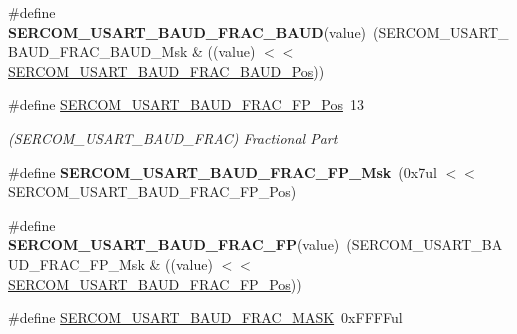 \begin{DoxyCompactItemize}
\item 
\hypertarget{group___s_a_m_l21___s_e_r_c_o_m_gabd6ad21c63e82ef1b06b39a46a5aab1a}{}\#define {\bfseries S\+E\+R\+C\+O\+M\+\_\+\+U\+S\+A\+R\+T\+\_\+\+B\+A\+U\+D\+\_\+\+F\+R\+A\+C\+\_\+\+B\+A\+U\+D}(value)~(S\+E\+R\+C\+O\+M\+\_\+\+U\+S\+A\+R\+T\+\_\+\+B\+A\+U\+D\+\_\+\+F\+R\+A\+C\+\_\+\+B\+A\+U\+D\+\_\+\+Msk \& ((value) $<$$<$ \hyperlink{group___s_a_m_l21___s_e_r_c_o_m_ga2091fb88df34a0e20b88f6e63c31d953}{S\+E\+R\+C\+O\+M\+\_\+\+U\+S\+A\+R\+T\+\_\+\+B\+A\+U\+D\+\_\+\+F\+R\+A\+C\+\_\+\+B\+A\+U\+D\+\_\+\+Pos}))\label{group___s_a_m_l21___s_e_r_c_o_m_gabd6ad21c63e82ef1b06b39a46a5aab1a}

\item 
\hypertarget{group___s_a_m_l21___s_e_r_c_o_m_ga8a5c9a949a3fc03e5aca3d033fd0b323}{}\#define \hyperlink{group___s_a_m_l21___s_e_r_c_o_m_ga8a5c9a949a3fc03e5aca3d033fd0b323}{S\+E\+R\+C\+O\+M\+\_\+\+U\+S\+A\+R\+T\+\_\+\+B\+A\+U\+D\+\_\+\+F\+R\+A\+C\+\_\+\+F\+P\+\_\+\+Pos}~13\label{group___s_a_m_l21___s_e_r_c_o_m_ga8a5c9a949a3fc03e5aca3d033fd0b323}

\begin{DoxyCompactList}\small\item\em (S\+E\+R\+C\+O\+M\+\_\+\+U\+S\+A\+R\+T\+\_\+\+B\+A\+U\+D\+\_\+\+F\+R\+A\+C) Fractional Part \end{DoxyCompactList}\item 
\hypertarget{group___s_a_m_l21___s_e_r_c_o_m_gaeb0b40ddb849a5b98eb5c2a9f0b0aff2}{}\#define {\bfseries S\+E\+R\+C\+O\+M\+\_\+\+U\+S\+A\+R\+T\+\_\+\+B\+A\+U\+D\+\_\+\+F\+R\+A\+C\+\_\+\+F\+P\+\_\+\+Msk}~(0x7ul $<$$<$ S\+E\+R\+C\+O\+M\+\_\+\+U\+S\+A\+R\+T\+\_\+\+B\+A\+U\+D\+\_\+\+F\+R\+A\+C\+\_\+\+F\+P\+\_\+\+Pos)\label{group___s_a_m_l21___s_e_r_c_o_m_gaeb0b40ddb849a5b98eb5c2a9f0b0aff2}

\item 
\hypertarget{group___s_a_m_l21___s_e_r_c_o_m_ga93d922141b4cdfb68e06d810362ab3e4}{}\#define {\bfseries S\+E\+R\+C\+O\+M\+\_\+\+U\+S\+A\+R\+T\+\_\+\+B\+A\+U\+D\+\_\+\+F\+R\+A\+C\+\_\+\+F\+P}(value)~(S\+E\+R\+C\+O\+M\+\_\+\+U\+S\+A\+R\+T\+\_\+\+B\+A\+U\+D\+\_\+\+F\+R\+A\+C\+\_\+\+F\+P\+\_\+\+Msk \& ((value) $<$$<$ \hyperlink{group___s_a_m_l21___s_e_r_c_o_m_ga8a5c9a949a3fc03e5aca3d033fd0b323}{S\+E\+R\+C\+O\+M\+\_\+\+U\+S\+A\+R\+T\+\_\+\+B\+A\+U\+D\+\_\+\+F\+R\+A\+C\+\_\+\+F\+P\+\_\+\+Pos}))\label{group___s_a_m_l21___s_e_r_c_o_m_ga93d922141b4cdfb68e06d810362ab3e4}

\item 
\hypertarget{group___s_a_m_l21___s_e_r_c_o_m_gaeafbaa42f578e00919248cc4dc8a17eb}{}\#define \hyperlink{group___s_a_m_l21___s_e_r_c_o_m_gaeafbaa42f578e00919248cc4dc8a17eb}{S\+E\+R\+C\+O\+M\+\_\+\+U\+S\+A\+R\+T\+\_\+\+B\+A\+U\+D\+\_\+\+F\+R\+A\+C\+\_\+\+M\+A\+S\+K}~0x\+F\+F\+F\+Ful\label{group___s_a_m_l21___s_e_r_c_o_m_gaeafbaa42f578e00919248cc4dc8a17eb}


\end{DoxyCompactItemize}
